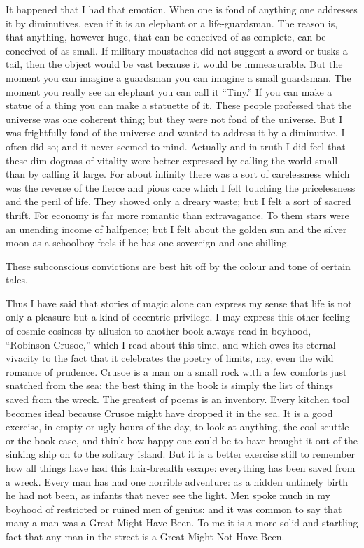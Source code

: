 \documentclass{book}
\begin{document}
It happened that I had that emotion. When one is fond of anything one addresses it by diminutives, even if it is an elephant or a life-guardsman. The reason is, that anything, however huge, that can be conceived of as complete, can be conceived of as small. If military moustaches did not suggest a sword or tusks a tail, then the object would be vast because it would be immeasurable. But the moment you can imagine a guardsman you can imagine a small guardsman. The moment you really see an elephant you can call it “Tiny.” If you can make a statue of a thing you can make a statuette of it. These people professed that the universe was one coherent thing; but they were not fond of the universe. But I was frightfully fond of the universe and wanted to address it by a diminutive. I often did so; and it never seemed to mind. Actually and in truth I did feel that these dim dogmas of vitality were better expressed by calling the world small than by calling it large. For about infinity there was a sort of carelessness which was the reverse of the fierce and pious care which I felt touching the pricelessness and the peril of life. They showed only a dreary waste; but I felt a sort of sacred thrift. For economy is far more romantic than extravagance. To them stars were an unending income of halfpence; but I felt about the golden sun and the silver moon as a schoolboy feels if he has one sovereign and one shilling.

These subconscious convictions are best hit off by the colour and tone of certain tales.

Thus I have said that stories of magic alone can express my sense that life is not only a pleasure but a kind of eccentric privilege. I may express this other feeling of cosmic cosiness by allusion to another book always read in boyhood, “Robinson Crusoe,” which I read about this time, and which owes its eternal vivacity to the fact that it celebrates the poetry of limits, nay, even the wild romance of prudence. Crusoe is a man on a small rock with a few comforts just snatched from the sea: the best thing in the book is simply the list of things saved from the wreck. The greatest of poems is an inventory. Every kitchen tool becomes ideal because Crusoe might have dropped it in the sea. It is a good exercise, in empty or ugly hours of the day, to look at anything, the coal-scuttle or the book-case, and think how happy one could be to have brought it out of the sinking ship on to the solitary island. But it is a better exercise still to remember how all things have had this hair-breadth escape: everything has been saved from a wreck. Every man has had one horrible adventure: as a hidden untimely birth he had not been, as infants that never see the light. Men spoke much in my boyhood of restricted or ruined men of genius: and it was common to say that many a man was a Great Might-Have-Been. To me it is a more solid and startling fact that any man in the street is a Great Might-Not-Have-Been.
\end{document}
